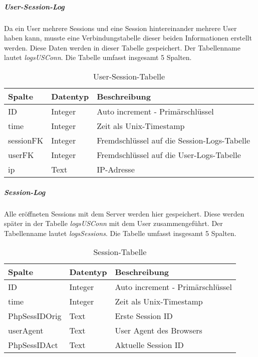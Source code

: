 \subparagraph{User-Session-Log\\}
Da ein User mehrere Sessions und eine Session hintereinander mehrere User haben kann, musste eine Verbindungstabelle dieser beiden Informationen erstellt werden. Diese Daten werden in dieser Tabelle gespeichert. Der Tabellenname lautet \textit{logsUSConn}. Die Tabelle umfasst insgesamt 5 Spalten.

\begin{table}[H]
\centering
\begin{tabular}{p{2.5 cm}p{2.5 cm}p{10 cm}}
   \toprule
   \textbf{Spalte} & \textbf{Datentyp} & \textbf{Beschreibung} \\
   \midrule
          ID & Integer & Auto increment - Primärschlüssel  \\
          \hline
          time & Integer & Zeit als Unix-Timestamp   \\
          \hline
	      sessionFK & Integer & Fremdschlüssel auf die Session-Logs-Tabelle   \\
	      \hline
          userFK & Integer & Fremdschlüssel auf die User-Logs-Tabelle   \\
          \hline
          ip & Text & IP-Adresse  \\
   \bottomrule
\end{tabular}
\caption{User-Session-Tabelle}
\end{table}

\newpage
\subparagraph{Session-Log\\}
Alle eröffneten Sessions mit dem Server werden hier gespeichert. Diese werden später in der Tabelle \textit{logsUSConn} mit dem User zusammengeführt. Der Tabellenname lautet \textit{logsSessions}. Die Tabelle umfasst insgesamt 5 Spalten.

\begin{table}[H]
\centering
\begin{tabular}{p{2.5 cm}p{2.5 cm}p{10 cm}}
   \toprule
   \textbf{Spalte} & \textbf{Datentyp} & \textbf{Beschreibung} \\
   \midrule
          ID & Integer & Auto increment - Primärschlüssel  \\
          \hline
          time & Integer & Zeit als Unix-Timestamp   \\
          \hline
	      PhpSessIDOrig & Text & Erste Session ID   \\
	      \hline
          userAgent & Text & User Agent des Browsers   \\
          \hline
          PhpSessIDAct & Text & Aktuelle Session ID  \\
   \bottomrule
\end{tabular}
\caption{Session-Tabelle}
\end{table}

